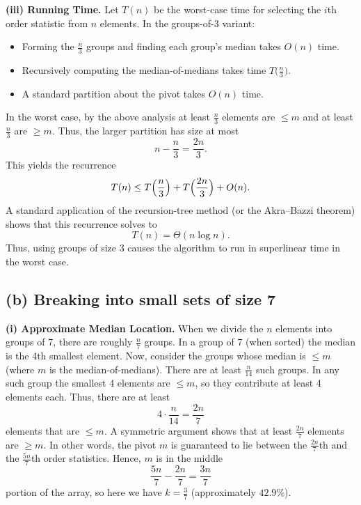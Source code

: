 \documentclass[11pt]{article}
\begin{document}
    \textbf{(iii) Running Time.}  
    Let \(T(n)\) be the worst-case time for selecting the \(i\)th order statistic from \(n\) elements. In the groups-of-3 variant:
    \begin{itemize}
        \item Forming the \(\frac{n}{3}\) groups and finding each group’s median takes \(O(n)\) time.
        \item Recursively computing the median-of-medians takes time \(T\bigl(\frac{n}{3}\bigr)\).
        \item A standard partition about the pivot takes \(O(n)\) time.
    \end{itemize}
    In the worst case, by the above analysis at least \(\frac{n}{3}\) elements are \(\le m\) and at least \(\frac{n}{3}\) are \(\ge m\). Thus, the larger partition has size at most
    \[
    n - \frac{n}{3} = \frac{2n}{3}.
    \]
    This yields the recurrence
    \[
    T(n) \le T\Bigl(\frac{n}{3}\Bigr) + T\Bigl(\frac{2n}{3}\Bigr) + O(n).
    \]
    A standard application of the recursion-tree method (or the Akra–Bazzi theorem) shows that this recurrence solves to
    \[
    T(n) = \Theta(n\log n).
    \]
    Thus, using groups of size 3 causes the algorithm to run in superlinear time in the worst case.
    
    \bigskip
    
    \subsection*{(b) Breaking into small sets of size 7}
    
    \textbf{(i) Approximate Median Location.}  
    When we divide the \(n\) elements into groups of 7, there are roughly \(\frac{n}{7}\) groups. In a group of 7 (when sorted) the median is the 4th smallest element. Now, consider the groups whose median is \(\le m\) (where \(m\) is the median-of-medians). There are at least \(\frac{n}{14}\) such groups. In any such group the smallest 4 elements are \(\le m\), so they contribute at least 4 elements each. Thus, there are at least
    \[
    4\cdot\frac{n}{14} = \frac{2n}{7}
    \]
    elements that are \(\le m\). A symmetric argument shows that at least \(\frac{2n}{7}\) elements are \(\ge m\). In other words, the pivot \(m\) is guaranteed to lie between the \(\frac{2n}{7}\)th and the \(\frac{5n}{7}\)th order statistics. Hence, \(m\) is in the middle
    \[
    \frac{5n}{7} - \frac{2n}{7} = \frac{3n}{7}
    \]
    portion of the array, so here we have \(k = \frac{3}{7}\) (approximately \(42.9\%\)).
    
\end{document}
